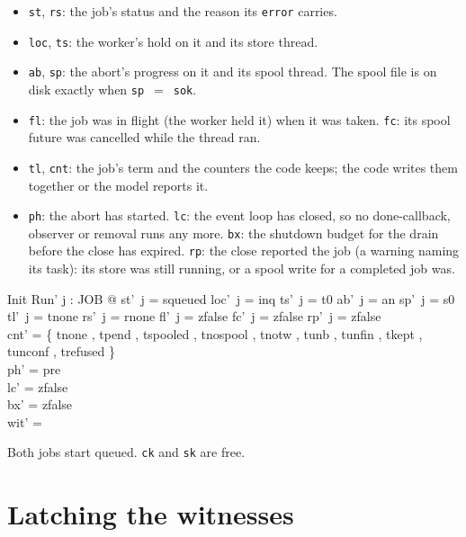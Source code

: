 \documentclass[a4paper,10pt,fleqn]{article}
\newcommand{\field}[1]{\texttt{#1}}
\begin{document}
\begin{itemize}
  \item \field{st}, \field{rs}: the job's status and the reason its \field{error}
    carries.
  \item \field{loc}, \field{ts}: the worker's hold on it and its store thread.
  \item \field{ab}, \field{sp}: the abort's progress on it and its spool thread.
    The spool file is on disk exactly when \field{sp}~$=$~\field{sok}.
  \item \field{fl}: the job was in flight (the worker held it) when it was
    taken. \field{fc}: its spool future was cancelled while the thread ran.
  \item \field{tl}, \field{cnt}: the job's term and the counters the code keeps;
    the code writes them together or the model reports it.
  \item \field{ph}: the abort has started. \field{lc}: the event loop has
    closed, so no done-callback, observer or removal runs any more. \field{bx}:
    the shutdown budget for the drain before the close has expired.
    \field{rp}: the close reported the job (a warning naming its task): its store
    was still running, or a spool write for a completed job was.
\end{itemize}

\begin{schema}{Init}
Run'
\where
\forall j : JOB @ st'~j = squeued \land loc'~j = inq \land ts'~j = t0 \land
  ab'~j = an \land sp'~j = s0 \land tl'~j = tnone \land rs'~j = rnone \land
  fl'~j = zfalse \land fc'~j = zfalse \land rp'~j = zfalse \\
cnt' = \{ tnone , tpend , tspooled , tnospool ,
  tnotw , tunb , tunfin , tkept ,
  tunconf , trefused  \} \\
ph' = pre \\
lc' = zfalse \\
bx' = zfalse \\
wit' = \emptyset
\end{schema}

Both jobs start queued. \field{ck} and \field{sk} are free.


\section{Latching the witnesses}
\label{sec:latch}
\end{document}
